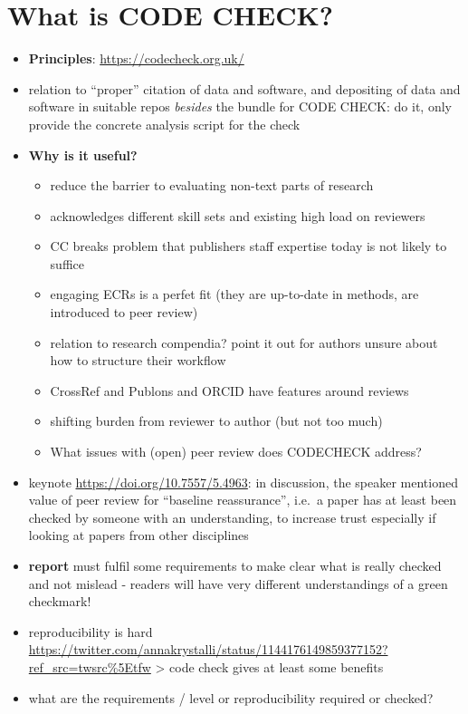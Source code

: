 \documentclass[12pt]{article}
\begin{document}
\section*{What is CODE CHECK?}\label{what-is-code-check}

\begin{itemize}
\item
  \textbf{Principles}: \url{https://codecheck.org.uk/}
\item
  relation to ``proper'' citation of data and software, and depositing
  of data and software in suitable repos \emph{besides} the bundle for
  CODE CHECK: do it, only provide the concrete analysis script for the
  check
\item
  \textbf{Why is it useful?}

  \begin{itemize}
  \item
    reduce the barrier to evaluating non-text parts of research
  \item
    acknowledges different skill sets and existing high load on
    reviewers
  \item
    CC breaks problem that publishers staff expertise today is not
    likely to suffice
  \item
    engaging ECRs is a perfet fit (they are up-to-date in methods, are
    introduced to peer review)
  \item
    relation to research compendia? point it out for authors unsure
    about how to structure their workflow
  \item
    CrossRef and Publons and ORCID have features around reviews
  \item
    shifting burden from reviewer to author (but not too much)
  \item
    What issues with (open) peer review does CODECHECK address?
  \end{itemize}
\item
  keynote \url{https://doi.org/10.7557/5.4963}: in discussion, the
  speaker mentioned value of peer review for ``baseline reassurance'',
  i.e.~a paper has at least been checked by someone with an
  understanding, to increase trust especially if looking at papers from
  other disciplines
\item
  \textbf{report} must fulfil some requirements to make clear what is
  really checked and not mislead - readers will have very different
  understandings of a green checkmark!
\item
  reproducibility is hard
  \url{https://twitter.com/annakrystalli/status/1144176149859377152?ref_src=twsrc\%5Etfw}
  \textgreater{} code check gives at least some benefits
\item
  what are the requirements / level or reproducibility required or
  checked?


\end{itemize}
\end{document}
